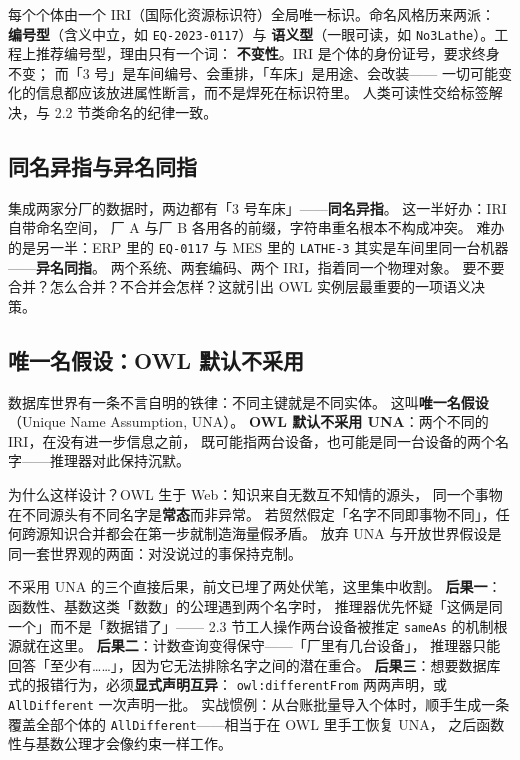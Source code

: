 每个个体由一个 IRI（国际化资源标识符）全局唯一标识。命名风格历来两派：
\textbf{编号型}（含义中立，如 \texttt{EQ-2023-0117}）与
\textbf{语义型}（一眼可读，如 \texttt{No3Lathe}）。工程上推荐编号型，理由只有一个词：
\textbf{不变性}。IRI 是个体的身份证号，要求终身不变；
而「3 号」是车间编号、会重排，「车床」是用途、会改装——
一切可能变化的信息都应该放进属性断言，而不是焊死在标识符里。
人类可读性交给标签解决，与 2.2 节类命名的纪律一致。

\subsection{同名异指与异名同指}

集成两家分厂的数据时，两边都有「3 号车床」——\textbf{同名异指}。
这一半好办：IRI 自带命名空间，
厂 A 与厂 B 各用各的前缀，字符串重名根本不构成冲突。
难办的是另一半：ERP 里的 \texttt{EQ-0117} 与 MES 里的 \texttt{LATHE-3}
其实是车间里同一台机器——\textbf{异名同指}。
两个系统、两套编码、两个 IRI，指着同一个物理对象。
要不要合并？怎么合并？不合并会怎样？这就引出 OWL 实例层最重要的一项语义决策。

\subsection{唯一名假设：OWL 默认不采用}

数据库世界有一条不言自明的铁律：不同主键就是不同实体。
这叫\textbf{唯一名假设}（Unique Name Assumption, UNA）。
\textbf{OWL 默认不采用 UNA}：两个不同的 IRI，在没有进一步信息之前，
既可能指两台设备，也可能是同一台设备的两个名字——推理器对此保持沉默。

为什么这样设计？OWL 生于 Web：知识来自无数互不知情的源头，
同一个事物在不同源头有不同名字是\textbf{常态}而非异常。
若贸然假定「名字不同即事物不同」，任何跨源知识合并都会在第一步就制造海量假矛盾。
放弃 UNA 与开放世界假设是同一套世界观的两面：对没说过的事保持克制。

不采用 UNA 的三个直接后果，前文已埋了两处伏笔，这里集中收割。
\textbf{后果一}：函数性、基数这类「数数」的公理遇到两个名字时，
推理器优先怀疑「这俩是同一个」而不是「数据错了」——
2.3 节工人操作两台设备被推定 \texttt{sameAs} 的机制根源就在这里。
\textbf{后果二}：计数查询变得保守——「厂里有几台设备」，
推理器只能回答「至少有……」，因为它无法排除名字之间的潜在重合。
\textbf{后果三}：想要数据库式的报错行为，必须\textbf{显式声明互异}：
\texttt{owl:differentFrom} 两两声明，或 \texttt{AllDifferent} 一次声明一批。
实战惯例：从台账批量导入个体时，顺手生成一条覆盖全部个体的
\texttt{AllDifferent}——相当于在 OWL 里手工恢复 UNA，
之后函数性与基数公理才会像约束一样工作。

